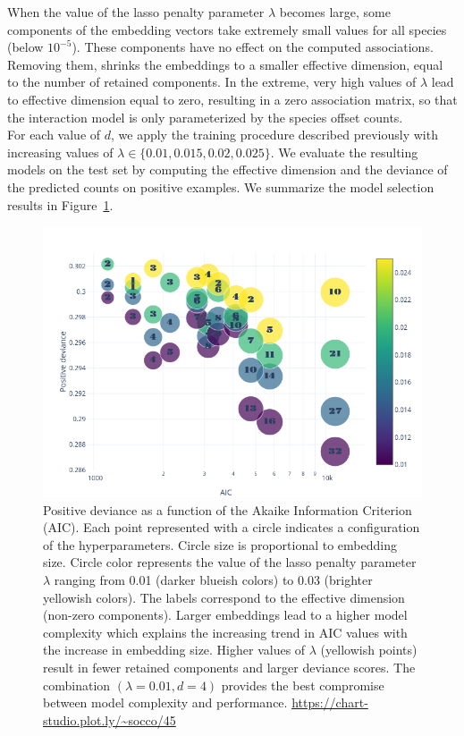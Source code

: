 \documentclass[10pt,a4paper]{article}
\begin{document}
When the value of the lasso penalty parameter $\lambda$ becomes large, some components of the embedding vectors take extremely small values for all species (below $10^{-5}$). These components have no effect on the computed associations. Removing them, shrinks the embeddings to a smaller effective dimension, equal to the number of retained components. In the extreme, very high values of $\lambda$ lead to effective dimension equal to zero, resulting in a zero association matrix, so that the interaction model is only parameterized by the species offset counts.\\

For each value of $d$, we apply the training procedure described previously with increasing values of $\lambda \in \{0.01,0.015,0.02,0.025\}$. We evaluate the resulting models on the test set by computing the effective dimension and the deviance of the predicted counts on positive examples. We summarize the model selection results in Figure~\ref{gridaravo}.\\

\begin{figure}[bthp]
	\centering
	\includegraphics[scale=0.5]{gridaravo}
	\caption{Positive deviance as a function of the Akaike Information Criterion (AIC). Each point represented with a circle indicates a configuration of the hyperparameters. Circle size is proportional to embedding size. Circle color represents the value of the lasso penalty parameter $\lambda$ ranging from 0.01 (darker blueish colors) to 0.03 (brighter yellowish colors). The labels correspond to the effective dimension (non-zero components). Larger embeddings lead to a higher model complexity which explains the increasing trend in AIC values with the increase in embedding size. Higher values of $\lambda$ (yellowish points) result in fewer retained components and larger deviance scores. The combination $(\lambda=0.01,d=4)$ provides the best compromise between model complexity and performance.  \url{https://chart-studio.plot.ly/~socco/45}}
	\label{gridaravo}
\end{figure}
\end{document}
